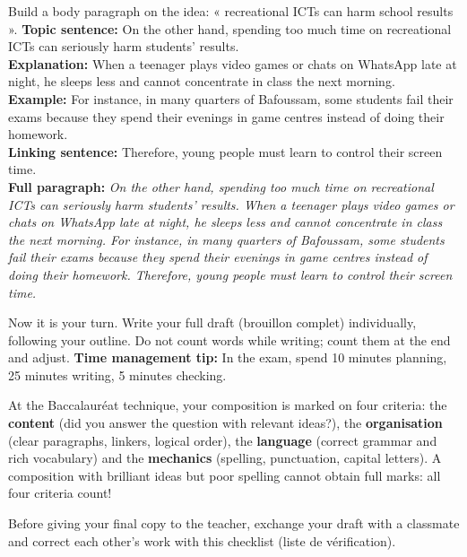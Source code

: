 \documentclass[11pt]{article}
\newcommand{\cle}[1]{{\popxbold\color{popdark}#1}}
\newcounter{popsec}
\newcounter{popsub}
\newcommand{\courssub}[1]{%
  \stepcounter{popsub}%
  \par\vspace{9pt}\noindent{\popxbold\fontsize{11.5}{13}\selectfont\color{popink}{\color{poporange}\thepopsec.\thepopsub}\hspace{6pt}#1}\par\nopagebreak\vspace{4pt}
}
\begin{document}
\begin{exoresolu}
Build a body paragraph on the idea: « recreational ICTs can harm school results ».
\tcblower
\textbf{Topic sentence:} On the other hand, spending too much time on recreational ICTs can seriously harm students' results.\\
\textbf{Explanation:} When a teenager plays video games or chats on WhatsApp late at night, he sleeps less and cannot concentrate in class the next morning.\\
\textbf{Example:} For instance, in many quarters of Bafoussam, some students fail their exams because they spend their evenings in game centres instead of doing their homework.\\
\textbf{Linking sentence:} Therefore, young people must learn to control their screen time.\\
\textbf{Full paragraph:} \emph{On the other hand, spending too much time on recreational ICTs can seriously harm students' results. When a teenager plays video games or chats on WhatsApp late at night, he sleeps less and cannot concentrate in class the next morning. For instance, in many quarters of Bafoussam, some students fail their exams because they spend their evenings in game centres instead of doing their homework. Therefore, young people must learn to control their screen time.}
\end{exoresolu}

Now it is your turn. Write your \cle{full draft} (brouillon complet) individually, following your outline. Do not count words while writing; count them at the end and adjust. \textbf{Time management tip:} In the exam, spend 10 minutes planning, 25 minutes writing, 5 minutes checking.

\begin{savaistu}
At the Baccalauréat technique, your composition is marked on four criteria: the \textbf{content} (did you answer the question with relevant ideas?), the \textbf{organisation} (clear paragraphs, linkers, logical order), the \textbf{language} (correct grammar and rich vocabulary) and the \textbf{mechanics} (spelling, punctuation, capital letters). A composition with brilliant ideas but poor spelling cannot obtain full marks: all four criteria count!
\end{savaistu}

\courssub{Peer correction with a checklist}

Before giving your final copy to the teacher, exchange your draft with a classmate and correct each other's work with this \cle{checklist} (liste de vérification).
\end{document}
